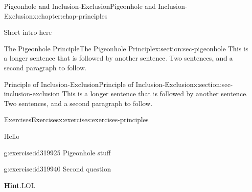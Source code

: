 \documentclass[oneside,10pt,]{book}
\newcommand{\blocktitlefont}{\relax}
\numberwithin{equation}{section}
\begin{document}
\typeout{************************************************}
%
\begin{chapterptx}{Pigeonhole and Inclusion-Exclusion}{}{Pigeonhole and Inclusion-Exclusion}{}{}{x:chapter:chap-principles}
\begin{introduction}{}%
Short intro here%
\end{introduction}%
%
%
\typeout{************************************************}
\typeout{************************************************}
%
\begin{sectionptx}{The Pigeonhole Principle}{}{The Pigeonhole Principle}{}{}{x:section:sec-pigeonhole}
This is a longer sentence that is followed by another sentence. Two sentences, and a second paragraph to follow.%
\end{sectionptx}
%
%
\typeout{************************************************}
\typeout{************************************************}
%
\begin{sectionptx}{Principle of Inclusion-Exclusion}{}{Principle of Inclusion-Exclusion}{}{}{x:section:sec-inclusion-exclusion}
This is a longer sentence that is followed by another sentence. Two sentences, and a second paragraph to follow.%
\end{sectionptx}
%
%
\typeout{************************************************}
\typeout{************************************************}
%
\begin{exercises-section}{Exercises}{}{Exercises}{}{}{x:exercises:exercises-principles}
\begin{introduction}{}%
Hello%
\end{introduction}%
\begin{divisionexercise}{1}{}{}{g:exercise:id319925}%
Pigeonhole stuff%
\end{divisionexercise}%
\begin{divisionexercise}{2}{}{}{g:exercise:id319940}%
Second question%
\par\smallskip%
\noindent\textbf{\blocktitlefont Hint}.\hypertarget{g:hint:id319944}{}\quad{}LOL%
\end{divisionexercise}%
\end{exercises-section}
\end{chapterptx}
%
\end{document}
